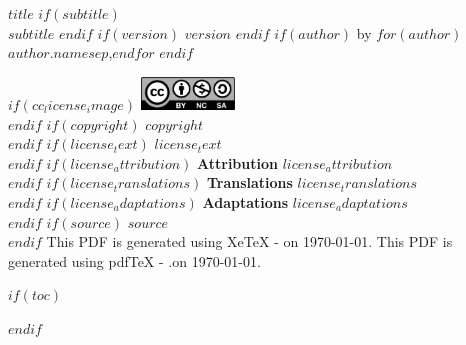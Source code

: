\documentclass[
    $if(fontsize)$$fontsize$$else$10pt$endif$,
    $if(papersize)$$papersize$$else$letterpaper$endif$,
    titlepage,
    oneside,
    openright,
    $if(draft)$draft$else$final$endif$,
    article]{memoir}
\begin{document}
\frontmatter

%
%
\thispagestyle{empty}
\begin{flushleft}
    {\bfseries $title$}
    $if(subtitle)$
        {\\\itshape $subtitle$}
    $endif$
    $if(version)$
        \normalsize {}\space $version$
    $endif$
    \hfill\newline
    $if(author)$
        \normalsize by
        $for(author)$\normalsize $author.name$$sep$,\space$endfor$
    $endif$
    \vspace*{1em}

    \vspace*{1.5em}
    $if(cc_license_image)$
        \includegraphics[keepaspectratio=true, width=2.5cm]
            {cc_by_nc_sa_40.eps}\\[1.2em]
    $endif$
    \justify
    $if(copyright)$
        \normalsize $copyright$\\[1.2em]
    $endif$
    $if(license_text)$
        \normalsize $license_text$\\[1.2em]
    $endif$
    $if(license_attribution)$
        \normalsize {\bfseries Attribution}\textemdash%
             $license_attribution$\\[1.2em]
    $endif$
    $if(license_translations)$
        \normalsize {\bfseries Translations}\textemdash%
            $license_translations$\\[1.2em]
    $endif$
    $if(license_adaptations)$
        \normalsize {\bfseries Adaptations}\textemdash%
            $license_adaptations$\\[1.2em]
    $endif$
    $if(source)$
        \normalsize $source$\\[1.2em]
    $endif$
    \ifxetex
        \normalsize This PDF is generated using XeTeX %
            \the\eTeXversion\eTeXrevision-%
            \the\XeTeXversion\XeTeXrevision\space on \today.
    \else
        \normalsize This PDF is generated using pdfTeX %
            \the\eTeXversion\eTeXrevision-%
            \the\pdftexversion.\pdftexrevision\space on \today.
    \fi
\end{flushleft}



\pagebreak
\cleardoublepage



%
%
$if(toc)$
{
    \cleardoublepage
    \begin{KeepFromToc} %
        \tableofcontents
    \end{KeepFromToc}
    \pagebreak
    \cleardoublepage
}
$endif$
\end{document}
